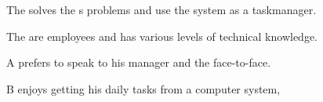 \begin{figure}[h]

\begin{sadlistar}{\Astaff}

 The \astaff{} solves the \aclient[]s problems and use the system as a taskmanager.  

 The \astaff[] are employees and has various levels of technical knowledge.

 \astaff[c] A prefers to speak to his manager and the \aclient[] face-to-face.

\astaff[c] B enjoys getting his daily tasks from a computer system, 
 \end{sadlistar}
 \caption{}
 \label{fig:actorstaff}
 \end{figure}